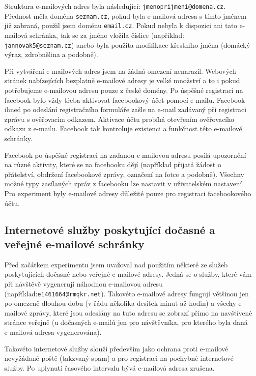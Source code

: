 \documentclass[thesis=M,czech]{FITthesis}[2013/05/10]
\begin{document}
Struktura e-mailových adres byla následující: \verb|jmenoprijmeni@domena.cz|. Přednost měla doména \verb|seznam.cz|, pokud byla e-mailová adresa s tímto jménem již zabraná, použil jsem doménu \verb|email.cz|. Pokud nebyla k dispozici ani tato e-mailová schránka, tak se za jméno vložila číslice (například: \verb|jannovak5@seznam.cz|) anebo byla použita modifikace křestního jména (domácký výraz, zdrobnělina a podobně).

Při vytváření e-mailových adres jsem na žádná omezení nenarazil. Webových stránek nabízejících bezplatně e-mailové adresy je velké množství a to i pokud potřebujeme e-mailovou adresu pouze z české domény. Po úspěšné registraci na facebook bylo vždy třeba aktivovat facebookový účet pomocí e-mailu. Facebook ihned po odeslání registračního formuláře zašle na e-mail zadávaný při registraci zprávu s ověřovacím odkazem. Aktivace účtu probíhá otevřením ověřovacího odkazu z e-mailu. Facebook tak kontroluje existenci a funkčnost této e-mailové schránky.

Facebook po úspěšné registraci na zadanou e-mailovou adresu posílá upozornění na různé aktivity, které se na facebooku dějí (například přijatá žádost o přátelství, obdržení facebookové zprávy, označení na fotce a podobně). Všechny možné typy zasílaných zpráv z facebooku lze nastavit v uživatelském nastavení. Pro experiment byly e-mailové adresy důležité pouze pro registraci facebookového účtu.

\subsection{Internetové služby poskytující dočasné a veřejné e-mailové schránky}

Před začátkem experimentu jsem uvažoval nad použitím některé ze služeb poskytujících dočasné nebo veřejné e-mailové adresy. Jedná se o služby, které vám při návštěvě vygenerují náhodnou e-mailovou adresu (například:\newline \verb|e1461664@rmqkr.net|). Takovéto e-mailové adresy fungují většinou jen po omezeně dlouhou dobu (v řádu několika desítek minut až hodin) a všechy e-mailové zprávy, které jsou odeslány na tuto adresu se zobrazí přímo na navštívené stránce veřejně (u dočasných e-mailů jen pro návštěvníka, pro kterého byla daná e-mailová adresa vygenerována).

Takovéto internetové služby slouží především jako ochrana proti e-mailové nevyžádané poště (takzvaný spam) a pro registraci na pochybné internetové služby. Po uplynutí časového intervalu bývá e-mailová adresa zrušena.
\end{document}
